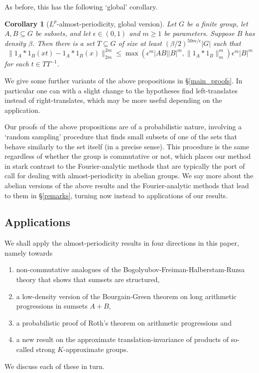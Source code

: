 \documentclass[12pt,a4paper,reqno]{amsart}
\numberwithin{equation}{section}
\theoremstyle{plain}
\newtheorem{corollary}[theorem]{Corollary}
\theoremstyle{definition}
\renewcommand{\leq}{\leqslant}
\renewcommand{\geq}{\geqslant}
\renewcommand{\subset}{\subseteq}
\providecommand{\norm}[1]{\lVert#1\rVert}
\begin{document}
As before, this has the following `global' corollary.

\begin{corollary}[$L^p$-almost-periodicity, global version]\label{L_p-global}
Let $G$ be a finite group, let $A, B \subset G$ be subsets, and let $\epsilon \in (0,1)$ and $m \geq 1$ be parameters. Suppose $B$ has density $\beta$. Then there is a set $T \subset G$ of size at least $(\beta/2)^{50m/\epsilon} |G|$ such that
\[ \norm{ 1_A*1_B(xt) - 1_A*1_B(x) }_{2m}^{2m} \leq \max\left(\epsilon^m |A B| |B|^m, \norm{ 1_A*1_B }_m^m \right) \epsilon^m |B|^m \]
for each $t \in T T^{-1}$.
\end{corollary}

We give some further variants of the above propositions in \S\ref{main_proofs}. In particular one can with a slight change to the hypotheses find left-translates instead of right-translates, which may be more useful depending on the application.

Our proofs of the above propositions are of a probabilistic nature, involving a `random sampling' procedure that finds small subsets of one of the sets that behave similarly to the set itself (in a precise sense). This procedure is the same regardless of whether the group is commutative or not, which places our method in stark contrast to the Fourier-analytic methods that are typically the port of call for dealing with almost-periodicity in abelian groups. We say more about the abelian versions of the above results and the Fourier-analytic methods that lead to them in \S\ref{remarks}, turning now instead to applications of our results.

\subsection{Applications}\label{applications}
We shall apply the almost-periodicity results in four directions in this paper, namely towards
\begin{enumerate}
\item non-commutative analogues of the Bogolyubov-Freiman-Halberstam-Ruzsa theory that shows that sumsets are structured,
\item a low-density version of the Bourgain-Green theorem on long arithmetic progressions in sumsets $A+B$,
\item a probabilistic proof of Roth's theorem on arithmetic progressions and
\item a new result on the approximate translation-invariance of products of so-called strong $K$-approximate groups.
\end{enumerate}
We discuss each of these in turn.
\end{document}
